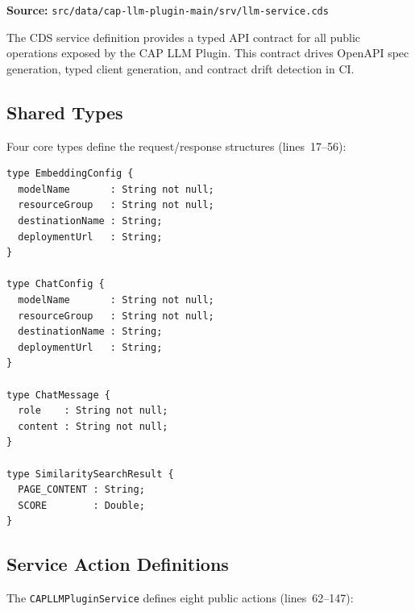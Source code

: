 \documentclass[11pt]{article}
\begin{document}
\noindent\textbf{Source:}
\texttt{src/data/cap-llm-plugin-main/srv/llm-service.cds}

The CDS service definition provides a typed API contract for all public
operations exposed by the CAP LLM Plugin. This contract drives OpenAPI spec
generation, typed client generation, and contract drift detection in CI.

\subsection{Shared Types}

Four core types define the request/response structures (lines~17--56):

\begin{lstlisting}[language=CDS,caption={Core CDS types (llm-service.cds, lines 31--56)},firstnumber=31]
type EmbeddingConfig {
  modelName       : String not null;
  resourceGroup   : String not null;
  destinationName : String;
  deploymentUrl   : String;
}

type ChatConfig {
  modelName       : String not null;
  resourceGroup   : String not null;
  destinationName : String;
  deploymentUrl   : String;
}

type ChatMessage {
  role    : String not null;
  content : String not null;
}

type SimilaritySearchResult {
  PAGE_CONTENT : String;
  SCORE        : Double;
}
\end{lstlisting}

\subsection{Service Action Definitions}

The \texttt{CAPLLMPluginService} defines eight public actions (lines~62--147):
\end{document}
